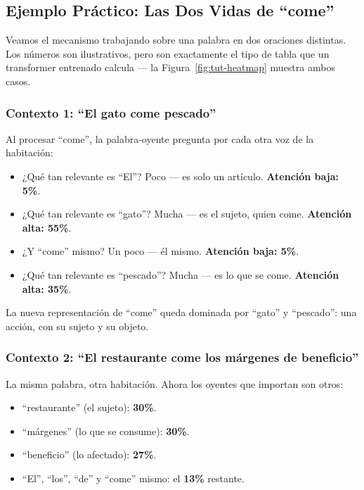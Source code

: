 \subsection{Ejemplo Práctico: Las Dos Vidas de ``come''}
\label{subsec:tut-example}

Veamos el mecanismo trabajando sobre una palabra en dos oraciones distintas. Los números son ilustrativos, pero son exactamente el tipo de tabla que un transformer entrenado calcula --- la Figura~\ref{fig:tut-heatmap} muestra ambos casos.

\subsubsection{Contexto 1: ``El gato come pescado''}

Al procesar ``come'', la palabra-oyente pregunta por cada otra voz de la habitación:
\begin{itemize}[leftmargin=*]
    \item ¿Qué tan relevante es ``El''? Poco --- es solo un artículo. \textbf{Atención baja: 5\%}.
    \item ¿Qué tan relevante es ``gato''? Mucha --- es el sujeto, quien come. \textbf{Atención alta: 55\%}.
    \item ¿Y ``come'' mismo? Un poco --- él mismo. \textbf{Atención baja: 5\%}.
    \item ¿Qué tan relevante es ``pescado''? Mucha --- es lo que se come. \textbf{Atención alta: 35\%}.
\end{itemize}
La nueva representación de ``come'' queda dominada por ``gato'' y ``pescado'': una acción, con su sujeto y su objeto.

\subsubsection{Contexto 2: ``El restaurante come los márgenes de beneficio''}

La misma palabra, otra habitación. Ahora los oyentes que importan son otros:
\begin{itemize}[leftmargin=*]
    \item ``restaurante'' (el sujeto): \textbf{30\%}.
    \item ``márgenes'' (lo que se consume): \textbf{30\%}.
    \item ``beneficio'' (lo afectado): \textbf{27\%}.
    \item ``El'', ``los'', ``de'' y ``come'' mismo: el \textbf{13\%} restante.
\end{itemize}

